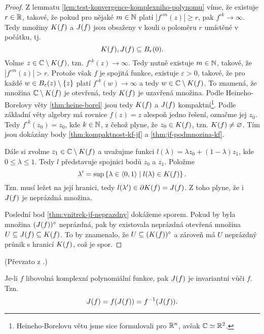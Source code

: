 \begin{proof}
    Z lemmatu \ref{lem:test-konvergence-komplexniho-polynomu} víme, že existuje $r\in\mathbb{R}$, takové, že pokud pro nějaké $m\in\mathbb{N}$ platí $|f^{\circ m}(z)|\geqslant r$, pak $f^{\circ k}\to\infty$. Tedy množiny $K(f)$ a $J(f)$ jsou obsaženy v kouli o poloměru $r$ umístěné v počátku, tj.
    \[K(f),J(f)\subseteq B_r(0).\]
    Volme $z\in\mathbb{C}\setminus K(f)$, tzn. $f^{\circ k}(z)\to\infty$. Tedy nutně existuje $m\in\mathbb{N}$, takové, že $|f^{\circ m}(z)|>r$. Protože však $f$ je spojitá funkce, existuje $\varepsilon>0$, takové, že pro každé $w\in B_\varepsilon(z)\setminus\left\{z\right\}$ platí $f^{\circ k}(w)\to\infty$ a tedy $w\in\mathbb{C}\setminus K(f)$. To znamená, že množina $\mathbb{C}\setminus K(f)$ je otevřená, tedy $K(f)$ je uzavřená množina. Podle Heineho-Borelovy věty \ref{thm:heine-borel} jsou tedy $K(f)$ a $J(f)$ kompaktní\footnote{Heineho-Borelovu větu jsme sice formulovali pro $\mathbb{R}^n$, avšak $\mathbb{C}\simeq\mathbb{R}^2$.}. Podle základní věty algebry má rovnice $f(z)=z$ alespoň jedno řešení, označme jej $z_0$. Tedy $f^{\circ k}(z_0)=z_0$, kde $k\in\mathbb{N}$, z čehož plyne, že $z_0\in K(f)$, tzn. $K(f)\neq\varnothing$. Tím jsou dokázány body \ref{thm:kompaktnost-kf-jf} a \ref{thm:jf-podmnozina-kf}.
    
    Dále si zvolme $z_1\in\mathbb{C}\setminus K(f)$ a uvažujme funkci $l(\lambda)=\lambda z_0+(1-\lambda)z_1$, kde $0\leqslant\lambda\leqslant 1$. Tedy $l$ představuje spojnici bodů $z_0$ a $z_1$. Položme
    \[\lambda^\prime=\sup\left\{\lambda\in\langle0,1\rangle\mid l(\lambda)\in K(f)\right\}.\]
    Tzn. musí ležet na její hranici, tedy $l(\lambda^\prime)\in\partial K(f)=J(f)$. Z toho plyne, že i $J(f)$ je neprázdná množina.

    Poslední bod \ref{thm:vnitrek-jf-neprazdny} dokážeme sporem. Pokud by byla množina $(J(f))^\circ$ neprázdná, pak by existovala neprázdná otevřená množina $U\subseteq J(f)\subseteq K(f)$. To by znamenalo, že $U\subseteq(K(f))^\circ$ a zároveň má $U$ neprázdný průnik s hranicí $K(f)$, což je spor.
\end{proof}
(Převzato z \citep[str. 237]{Falconer1989}.)
\begin{theorem}\label{invariance-jf}
    Je-li $f$ libovolná komplexní polynomiální funkce, pak $J(f)$ je invariantní vůči $f$. Tzn.
    \[J(f)=f(J(f))=f^{-1}(J(f)).\]
\end{theorem}
